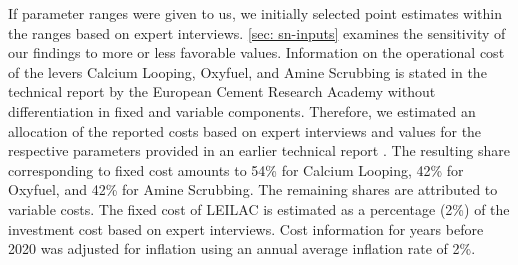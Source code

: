 \documentclass[12pt, a4paper]{article} %
\begin{document}
If parameter ranges were given to us, we initially selected point estimates within the ranges based on expert interviews. \ref{sec: sn-inputs} examines the sensitivity of our findings to more or less favorable values. Information on the operational cost of the levers Calcium Looping, Oxyfuel, and Amine Scrubbing is stated in the technical report by the European Cement Research Academy without differentiation in fixed and variable components. Therefore, we estimated an allocation of the reported costs based on expert interviews and values for the respective parameters provided in an earlier technical report \citep{anantharaman2018cemcap}. The resulting share corresponding to fixed cost amounts to 54\% for Calcium Looping, 42\% for Oxyfuel, and 42\% for Amine Scrubbing. The remaining shares are attributed to variable costs. The fixed cost of LEILAC is estimated as a percentage (2\%) of the investment cost based on expert interviews. Cost information for years before 2020 was adjusted for inflation using an annual average inflation rate of 2\%.
\end{document}
